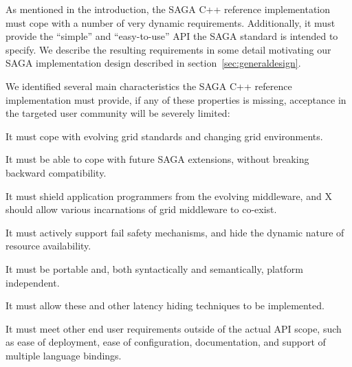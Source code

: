 
 As mentioned in the introduction, the SAGA C++ reference
 implementation must cope with a number of very dynamic requirements.  
 Additionally, it must provide the ``simple'' and
 ``easy-to-use'' API the SAGA standard is intended to specify.  
 We describe the resulting requirements in some detail
 motivating our SAGA implementation design described in 
 section~\ref{sec:generaldesign}.

We identified several main characteristics the SAGA C++ reference 
implementation must provide, if any of these properties is missing, 
acceptance in the targeted user community will be severely limited:

\begin{shortlist}
	\item It  must cope with evolving grid standards 
			  and changing grid environments.
  \item It must be able to cope with future SAGA
			  extensions, without breaking backward compatibility.
	\item It must shield application programmers
			  from the evolving middleware, and X
			  should allow various incarnations of grid middleware to co-exist.
	\item It must actively support fail safety mechanisms, and hide
		    the dynamic nature of resource availability.
	\item It must be portable and, both
				syntactically and semantically, platform independent.
	\item It must allow
				these and other latency hiding techniques to be implemented.
	\item It must meet other end user
				requirements outside of the actual API scope,
				such as ease of deployment, ease of configuration,
				documentation, and support of multiple language bindings.
\end{shortlist}


